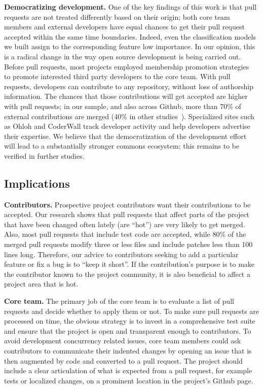 \documentclass{sig-alternate}
\begin{document}
%
\textbf{Democratizing development.} One of the key findings of this work is
that pull requests are not treated differently based on their origin; both core
team members and external developers have equal chances to get their pull
request accepted within the same time boundaries. Indeed, even the
classification models we built assign to the corresponding feature low
importance. In our opinion, this is a radical change in the way open source
development is being carried out. Before pull requests, most projects employed
membership promotion strategies~\cite{Jense07} to promote interested third party
developers to the core team. With pull requests, developers can contribute to
any repository, without loss of authorship information. The chances that those
contributions will get accepted are higher with pull requests; in our sample,
and also across Github, more than 70\% of external contributions are merged
(40\% in other studies~\cite{Rigby06, Weiss08}). Specialized sites such as
Ohloh and CoderWall track developer activity and help developers advertise their
expertise. We believe that the democratization of the development effort will
lead to a substantially stronger commons ecosystem; this remains to be
verified in further studies.

\subsection{Implications}

\textbf{Contributors.} Prospective project contributors want their
contributions to be accepted. Our research shows that pull requests that affect
parts of the project that  have been changed often lately (are ``hot'') are very
likely to get merged. Also, most pull requests that include test code are
accepted, while 80\% of the merged pull requests modify three or less files and
include patches less than 100 lines long. Therefore, our advice to contributors
seeking to add a particular feature or fix a bug is to ``keep it short''. If the
contribution's purpose is to make the contributor known to the project
community, it is also beneficial to affect a project area that is hot.

\textbf{Core team.} The primary job of the core team is to evaluate a list of
pull requests and decide whether to apply them or not. To make sure pull
requests are processed on time, the obvious strategy is to invest in a
comprehensive test suite and ensure that the project is open and transparent
enough to contributors. To avoid development concurrency related issues, core
team members could ask contributors to communicate their indented changes by
opening an issue that is then augmented by code and converted to a pull
request. The project should include a clear articulation of what is expected
from a pull request, for example tests or localized changes, on a prominent
location in the project's Github page.
\end{document}
